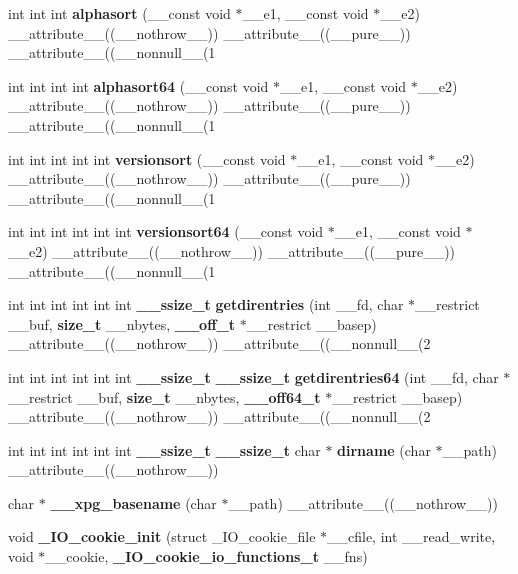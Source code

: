 \begin{DoxyCompactItemize}
\item 
int int int {\bf alphasort} (\_\-\_\-const void $\ast$\_\-\_\-e1, \_\-\_\-const void $\ast$\_\-\_\-e2) \_\-\_\-attribute\_\-\_\-((\_\-\_\-nothrow\_\-\_\-)) \_\-\_\-attribute\_\-\_\-((\_\-\_\-pure\_\-\_\-)) \_\-\_\-attribute\_\-\_\-((\_\-\_\-nonnull\_\-\_\-(1
\item 
int int int int {\bf alphasort64} (\_\-\_\-const void $\ast$\_\-\_\-e1, \_\-\_\-const void $\ast$\_\-\_\-e2) \_\-\_\-attribute\_\-\_\-((\_\-\_\-nothrow\_\-\_\-)) \_\-\_\-attribute\_\-\_\-((\_\-\_\-pure\_\-\_\-)) \_\-\_\-attribute\_\-\_\-((\_\-\_\-nonnull\_\-\_\-(1
\item 
int int int int int {\bf versionsort} (\_\-\_\-const void $\ast$\_\-\_\-e1, \_\-\_\-const void $\ast$\_\-\_\-e2) \_\-\_\-attribute\_\-\_\-((\_\-\_\-nothrow\_\-\_\-)) \_\-\_\-attribute\_\-\_\-((\_\-\_\-pure\_\-\_\-)) \_\-\_\-attribute\_\-\_\-((\_\-\_\-nonnull\_\-\_\-(1
\item 
int int int int int int {\bf versionsort64} (\_\-\_\-const void $\ast$\_\-\_\-e1, \_\-\_\-const void $\ast$\_\-\_\-e2) \_\-\_\-attribute\_\-\_\-((\_\-\_\-nothrow\_\-\_\-)) \_\-\_\-attribute\_\-\_\-((\_\-\_\-pure\_\-\_\-)) \_\-\_\-attribute\_\-\_\-((\_\-\_\-nonnull\_\-\_\-(1
\item 
int int int int int int {\bf \_\-\_\-ssize\_\-t} {\bf getdirentries} (int \_\-\_\-fd, char $\ast$\_\-\_\-restrict \_\-\_\-buf, {\bf size\_\-t} \_\-\_\-nbytes, {\bf \_\-\_\-off\_\-t} $\ast$\_\-\_\-restrict \_\-\_\-basep) \_\-\_\-attribute\_\-\_\-((\_\-\_\-nothrow\_\-\_\-)) \_\-\_\-attribute\_\-\_\-((\_\-\_\-nonnull\_\-\_\-(2
\item 
int int int int int int {\bf \_\-\_\-ssize\_\-t} {\bf \_\-\_\-ssize\_\-t} {\bf getdirentries64} (int \_\-\_\-fd, char $\ast$\_\-\_\-restrict \_\-\_\-buf, {\bf size\_\-t} \_\-\_\-nbytes, {\bf \_\-\_\-off64\_\-t} $\ast$\_\-\_\-restrict \_\-\_\-basep) \_\-\_\-attribute\_\-\_\-((\_\-\_\-nothrow\_\-\_\-)) \_\-\_\-attribute\_\-\_\-((\_\-\_\-nonnull\_\-\_\-(2
\item 
int int int int int int {\bf \_\-\_\-ssize\_\-t} {\bf \_\-\_\-ssize\_\-t} char $\ast$ {\bf dirname} (char $\ast$\_\-\_\-path) \_\-\_\-attribute\_\-\_\-((\_\-\_\-nothrow\_\-\_\-))
\item 
char $\ast$ {\bf \_\-\_\-xpg\_\-basename} (char $\ast$\_\-\_\-path) \_\-\_\-attribute\_\-\_\-((\_\-\_\-nothrow\_\-\_\-))
\item 
void {\bf \_\-IO\_\-cookie\_\-init} (struct \_\-IO\_\-cookie\_\-file $\ast$\_\-\_\-cfile, int \_\-\_\-read\_\-write, void $\ast$\_\-\_\-cookie, {\bf \_\-IO\_\-cookie\_\-io\_\-functions\_\-t} \_\-\_\-fns)

\end{DoxyCompactItemize}
